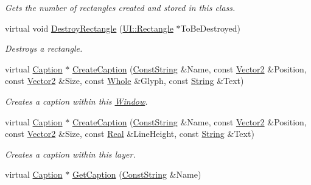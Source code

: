\begin{DoxyCompactItemize}
\begin{DoxyCompactList}\small\item\em Gets the number of rectangles created and stored in this class. \item\end{DoxyCompactList}\item 
virtual void \hyperlink{classphys_1_1UI_1_1Window_ab66c4c1d5f26e3f4fcdd34063b711365}{DestroyRectangle} (\hyperlink{classphys_1_1UI_1_1Rectangle}{UI::Rectangle} $\ast$ToBeDestroyed)
\begin{DoxyCompactList}\small\item\em Destroys a rectangle. \item\end{DoxyCompactList}\item 
virtual \hyperlink{classphys_1_1UI_1_1Caption}{Caption} $\ast$ \hyperlink{classphys_1_1UI_1_1Window_abeb483ca8dc2244bb8d79f80c1e3c773}{CreateCaption} (\hyperlink{namespacephys_a5ce5049f8b4bf88d6413c47b504ebb31}{ConstString} \&Name, const \hyperlink{classphys_1_1Vector2}{Vector2} \&Position, const \hyperlink{classphys_1_1Vector2}{Vector2} \&Size, const \hyperlink{namespacephys_a460f6bc24c8dd347b05e0366ae34f34a}{Whole} \&Glyph, const \hyperlink{namespacephys_aa03900411993de7fbfec4789bc1d392e}{String} \&Text)
\begin{DoxyCompactList}\small\item\em Creates a caption within this \hyperlink{classphys_1_1UI_1_1Window}{Window}. \item\end{DoxyCompactList}\item 
virtual \hyperlink{classphys_1_1UI_1_1Caption}{Caption} $\ast$ \hyperlink{classphys_1_1UI_1_1Window_aca6f1d94903deb799351e82df5afee5c}{CreateCaption} (\hyperlink{namespacephys_a5ce5049f8b4bf88d6413c47b504ebb31}{ConstString} \&Name, const \hyperlink{classphys_1_1Vector2}{Vector2} \&Position, const \hyperlink{classphys_1_1Vector2}{Vector2} \&Size, const \hyperlink{namespacephys_af7eb897198d265b8e868f45240230d5f}{Real} \&LineHeight, const \hyperlink{namespacephys_aa03900411993de7fbfec4789bc1d392e}{String} \&Text)
\begin{DoxyCompactList}\small\item\em Creates a caption within this layer. \item\end{DoxyCompactList}\item 
virtual \hyperlink{classphys_1_1UI_1_1Caption}{Caption} $\ast$ \hyperlink{classphys_1_1UI_1_1Window_acfc2669ecac2824bfa7cc53eb724d191}{GetCaption} (\hyperlink{namespacephys_a5ce5049f8b4bf88d6413c47b504ebb31}{ConstString} \&Name)

\end{DoxyCompactItemize}
